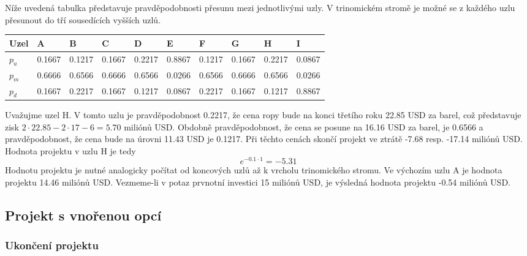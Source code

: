 \documentclass[a4paper]{book}
\begin{document}
Níže uvedená tabulka představuje pravděpodobnosti přesunu mezi jednotlivými uzly. V trinomickém stromě je možné se z každého uzlu přesunout do tří sousedících vyšších uzlů.
\begin{center}
\begin{tabular}{l l l l l l l l l l}
\hline
\textbf{Uzel} & \textbf{A} & \textbf{B} & \textbf{C} & \textbf{D} & \textbf{E} & \textbf{F} & \textbf{G} & \textbf{H} & \textbf{I} \\
\hline
$p_u$ & 0.1667 & 0.1217 & 0.1667 & 0.2217 & 0.8867 & 0.1217 & 0.1667 & 0.2217 & 0.0867\\
$p_m$ & 0.6666 & 0.6566 & 0.6666 & 0.6566 & 0.0266 & 0.6566 & 0.6666 & 0.6566 & 0.0266\\
$p_d$ & 0.1667 & 0.2217 & 0.1667 & 0.1217 & 0.0867 & 0.2217 & 0.1667 & 0.1217 & 0.8867\\
\end{tabular}
\end{center}
Uvažujme uzel H. V tomto uzlu je pravděpodobnost 0.2217, že cena ropy bude na konci třetího roku 22.85 USD za barel, což představuje zisk $2 \cdot 22.85 - 2 \cdot 17 - 6 = 5.70$ miliónů USD. Obdobně pravděpodobnost, že cena se posune na 16.16 USD za barel, je 0.6566 a pravděpodobnost, že cena bude na úrovni 11.43 USD je 0.1217. Při těchto cenách skončí projekt ve ztrátě -7.68 resp. -17.14 miliónů USD. Hodnota projektu v uzlu H je tedy
\begin{equation*}
[0.2217 \cdot 5.70 + 0.6566 \cdot (-7.68) + 0.1217 \cdot (-17.14)]e^{-0.1 \cdot 1} = -5.31
\end{equation*}
Hodnotu projektu je nutné analogicky počítat od koncových uzlů až k vrcholu trinomického stromu. Ve výchozím uzlu A je hodnota projektu 14.46 miliónů USD. Vezmeme-li v potaz prvnotní investici 15 miliónů USD, je výsledná hodnota projektu -0.54 miliónů USD.

\subsection{Projekt s vnořenou opcí}

\subsubsection{Ukončení projektu}
\end{document}
